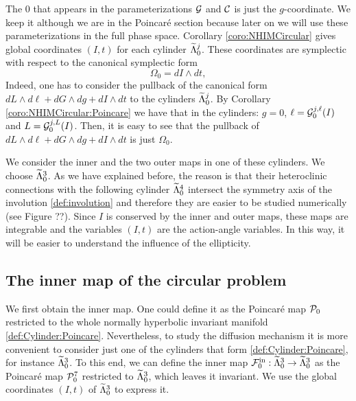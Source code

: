 The $0$ that appears in  the parameterizations $\mathcal{G}$ and $\mathcal{C}$ is just the $g$-coordinate. We keep it although we are in the Poincar\'e section because later on we will use these parameterizations in the full phase space. Corollary \ref{coro:NHIMCircular} gives  global coordinates $(I,t)$ for each cylinder $\widetilde\Lambda^j_0$. These coordinates are symplectic with respect to the canonical symplectic form
\begin{equation}\label{def:InnerDiffForm}
 \Omega_0=dI\wedge dt,
\end{equation}
Indeed, one has to consider the pullback of the canonical form $dL\wedge d\ell+dG\wedge dg+dI\wedge dt$ to the cylinders $\widetilde\Lambda_0^j$. By Corollary \ref{coro:NHIMCircular:Poincare} we have that in the cylinders: $g=0$, $\ell=\mathcal{G}_0^{j,\ell}(I)$ and $L=\mathcal{G}_0^{j,L}(I)$. Then, it is easy to see that the pullback of $dL\wedge d\ell+dG\wedge dg+dI\wedge dt$ is just $\Omega_0$.


We consider the inner and the two outer maps in one of these cylinders. We choose $\widetilde\Lambda_0^3$. As we have explained before, the reason is that their heteroclinic connections with the following cylinder $\widetilde\Lambda_0^4$ intersect the symmetry axis of the involution \eqref{def:involution} and therefore they are easier to be studied numerically (see Figure ??). Since $I$ is conserved by the inner and outer maps, these maps are integrable and the variables $(I,t)$ are the action-angle variables. In this way, it will be easier
to understand the influence of the ellipticity.


\subsection{The inner map of the circular problem}\label{sec:Circular:Inner}
We first obtain the inner map. One could define it as the Poincar\'e map $\mathcal{P}_0$ restricted to the whole normally hyperbolic invariant manifold \eqref{def:Cylinder:Poincare}. Nevertheless, to study the diffusion mechanism it is more convenient to consider just one of the cylinders that form \eqref{def:Cylinder:Poincare}, for instance $\widetilde\Lambda_0^3$. To this end, we can define the inner map $\mathcal{F}_0^{\mathrm{in}}:\widetilde\Lambda_0^3 \rightarrow \widetilde\Lambda_0^3$ as the Poincar\'e map $\mathcal{P}^7_0$ restricted to $\widetilde\Lambda_0^3$, which leaves it invariant. We use the global coordinates $(I,t)$ of $\widetilde\Lambda_0^3$ to express it.

